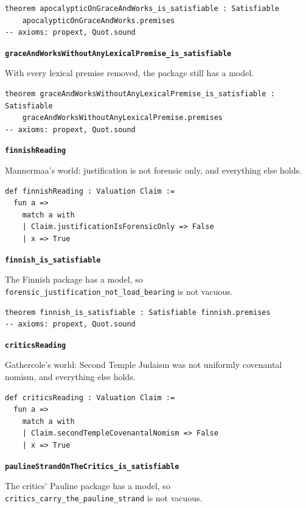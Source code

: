 \documentclass[11pt]{article}
\begin{document}
{\small\begin{verbatim}
theorem apocalypticOnGraceAndWorks_is_satisfiable : Satisfiable
    apocalypticOnGraceAndWorks.premises
-- axioms: propext, Quot.sound
\end{verbatim}}
\par\medskip\noindent\textbf{\texttt{grace\allowbreak{}And\allowbreak{}Works\allowbreak{}Without\allowbreak{}Any\allowbreak{}Lexical\allowbreak{}Premise\_\allowbreak{}is\_\allowbreak{}satisfiable}}\par\nobreak\noindent
With every lexical premise removed, the package still has a model.

{\small\begin{verbatim}
theorem graceAndWorksWithoutAnyLexicalPremise_is_satisfiable : Satisfiable
    graceAndWorksWithoutAnyLexicalPremise.premises
-- axioms: propext, Quot.sound
\end{verbatim}}
\par\medskip\noindent\textbf{\texttt{finnish\allowbreak{}Reading}}\par\nobreak\noindent
Mannermaa's world: justification is not forensic only, and everything else holds.

{\small\begin{verbatim}
def finnishReading : Valuation Claim :=
  fun a =>
    match a with
    | Claim.justificationIsForensicOnly => False
    | x => True
\end{verbatim}}
\par\medskip\noindent\textbf{\texttt{finnish\_\allowbreak{}is\_\allowbreak{}satisfiable}}\par\nobreak\noindent
The Finnish package has a model, so \texttt{forensic\_\allowbreak{}justification\_\allowbreak{}not\_\allowbreak{}load\_\allowbreak{}bearing} is not vacuous.

{\small\begin{verbatim}
theorem finnish_is_satisfiable : Satisfiable finnish.premises
-- axioms: propext, Quot.sound
\end{verbatim}}
\par\medskip\noindent\textbf{\texttt{critics\allowbreak{}Reading}}\par\nobreak\noindent
Gathercole's world: Second Temple Judaism was not uniformly covenantal nomism, and everything else holds.

{\small\begin{verbatim}
def criticsReading : Valuation Claim :=
  fun a =>
    match a with
    | Claim.secondTempleCovenantalNomism => False
    | x => True
\end{verbatim}}
\par\medskip\noindent\textbf{\texttt{pauline\allowbreak{}Strand\allowbreak{}On\allowbreak{}The\allowbreak{}Critics\_\allowbreak{}is\_\allowbreak{}satisfiable}}\par\nobreak\noindent
The critics' Pauline package has a model, so \texttt{critics\_\allowbreak{}carry\_\allowbreak{}the\_\allowbreak{}pauline\_\allowbreak{}strand} is not vacuous.
\end{document}
